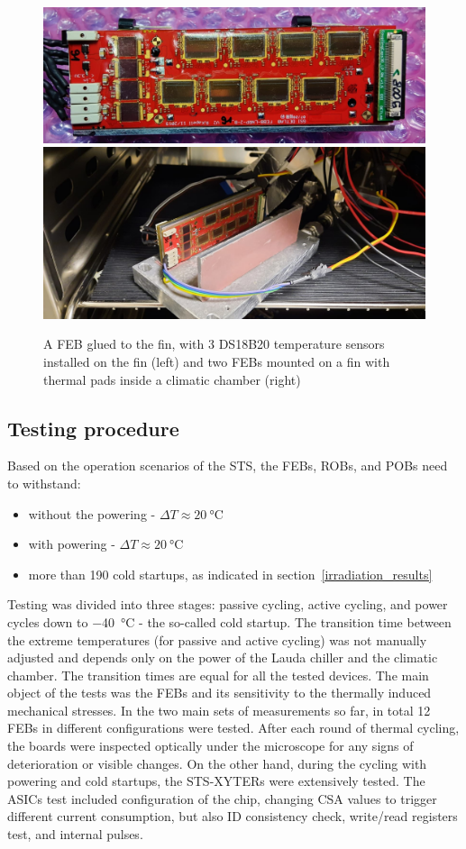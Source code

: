 \begin{figure}[!h]
\centering
\includegraphics[width=0.5\columnwidth]{Chapter4/images/FEBB_T_sensors.jpeg}
\includegraphics[width=0.4\columnwidth]{Chapter4/images/thermal_setup.jpeg}
\caption{A \gls{FEB} glued to the fin, with 3 DS18B20 temperature sensors installed on the fin (left) and two \gls{FEB}s mounted on a fin with thermal pads inside a climatic chamber (right)}
\label{fig_cycling_temps}
\end{figure}

\newpage

\subsection{Testing procedure}
Based on the operation scenarios of the \gls{STS}, the \gls{FEB}s, \gls{ROB}s, and \gls{POB}s need to withstand:
\begin{itemize}
    \item without the powering - $\Delta T\approx\SI{20}{\celsius} $
    \item with powering - $\Delta T\approx\SI{20}{\celsius} $
    \item more than 190 cold startups, as indicated in section~\ref{irradiation_results}
\end{itemize}
Testing was divided into three stages: passive cycling, active cycling, and power cycles down to \SI{-40}{\celsius} - the so-called cold startup. The transition time between the extreme temperatures (for passive and active cycling) was not manually adjusted and depends only on the power of the Lauda chiller and the climatic chamber. The transition times are equal for all the tested devices. The main object of the tests was the \gls{FEB}s and its sensitivity to the thermally induced mechanical stresses. In the two main sets of measurements so far, in total 12 \gls{FEB}s in different configurations were tested.  After each round of thermal cycling, the boards were inspected optically under the microscope for any signs of deterioration or visible changes. On the other hand, during the cycling with powering and cold startups, the STS-XYTERs were extensively tested. The \glspl{ASIC} test included configuration of the chip, changing \gls{CSA} values to trigger different current consumption, but also ID consistency check, write/read registers test, and internal pulses. 
